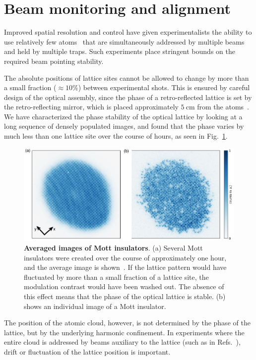 \documentclass[twocolumn,aps,pra,showpacs,preprintnumbers,bibnotes]{revtex4-1}
\newcommand\unit[2]{\ensuremath{#1~\mathrm{{#2}}}}
\begin{document}
\section{Beam monitoring and alignment}
Improved spatial resolution and control have given experimentalists the ability to use relatively few atoms~\cite{Preiss2015, Choi2016, Mazurenko2017} that are simultaneously addressed by multiple beams and held by multiple traps.
Such experiments place stringent bounds on the required beam pointing stability.

The absolute positions of lattice sites cannot be allowed to change by more than a small fraction ($\approx 10\%$) between experimental shots.
This is ensured by careful design of the optical assembly, since the phase of a retro-reflected lattice is set by the retro-reflecting mirror, which is placed approximately \unit{5}{cm} from the atoms~\cite{Huber2014}.
We have characterized the phase stability of the optical lattice by looking at a long sequence of densely populated images, and found that the phase varies by much less than one lattice site over the course of hours, as seen in Fig.~\ref{fig:averaged_mott}.

\begin{figure}
  \begin{center}
    \includegraphics{Figure12.pdf}
    \caption{\textbf{Averaged images of Mott insulators}. (a) Several Mott insulators were created over the course of approximately one hour, and the average image is shown~\cite{Greif2016}. If the lattice pattern would have fluctuated by more than a small fraction of a lattice site, the modulation contrast would have been washed out. The absence of this effect means that the phase of the optical lattice is stable. (b) shows an individual image of a Mott insulator.}\label{fig:averaged_mott}
  \end{center}
\end{figure}


The position of the atomic cloud, however, is not determined by the phase of the lattice, but by the underlying harmonic confinement.
In experiments where the entire cloud is addressed by beams auxiliary to the lattice (such as in Refs.~\cite{Choi2016,Mazurenko2017}), drift or fluctuation of the lattice position is important.
\end{document}

